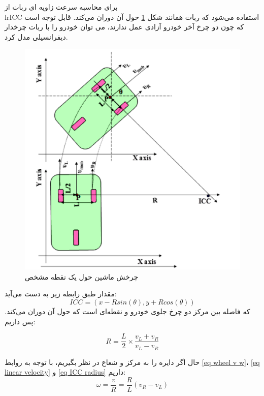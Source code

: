 برای محاسبه سرعت زاویه ای ربات از \\lr{ICC}  استفاده می‌شود که ربات همانند شکل \ref{Fig differential-robot-ICC} حول آن دوران می‌کند. قابل توجه است که چون دو چرخ آخر خودرو آزادی عمل ندارند، می توان خودرو را با ربات چرخدار دیفرانسیلی مدل کرد.
\begin{figure}[!h] 
	\centering
	\includegraphics[scale=0.28]{Images/differential-robot-ICC.png}
	\caption{چرخش ماشین حول یک نقطه مشخص} \label{Fig differential-robot-ICC}
\end{figure}

مقدار  طبق رابطه زیر به دست می‌آید:
\begin{equation}
ICC = (x - Rsin(\theta), y + Rcos(\theta))
\end{equation}
 که  فاصله بین مرکز دو چرخ جلوی خودرو و نقطه‌ای است که حول آن دوران می‌کند. پس داریم:
 
\begin{equation} \label{eq ICC radius}
R = \frac{L}{2} \times \frac{v_L + v_R}{v_L - v_R}
\end{equation}

حال اگر دایره را به مرکز  و شعاع  در نظر بگیریم، با توجه به روابط \ref{eq wheel v w}، \ref{eq linear velocity} و \ref{eq ICC radius} داریم:
\begin{equation} \label{eq forward kinematics w}
\omega = \frac{v}{R} = \frac{R}{L}(v_R - v_L)
\end{equation}

